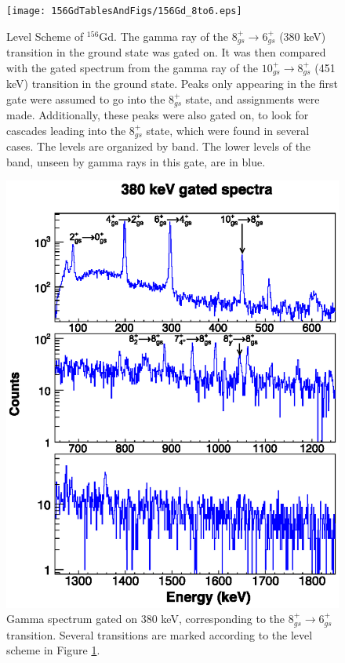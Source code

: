 \begin{figure}[!]
    \centering
    \texttt{[image: 156GdTablesAndFigs/156Gd\_8to6.eps]}
    \caption{Level Scheme of $^{156}$Gd. The gamma ray of the $8^+_{gs}\rightarrow 6^+_{gs}$ (380 keV) transition in the ground state was gated on. It was then compared with the gated spectrum from the gamma ray of the $10^+_{gs}\rightarrow 8^+_{gs}$ (451 keV) transition in the ground state. Peaks only appearing in the first gate were assumed to go into the $8^+_{gs}$ state, and assignments were made. Additionally, these peaks were also gated on, to look for cascades leading into the $8^+_{gs}$ state, which were found in several cases. The levels are organized by band. The lower levels of the band, unseen by gamma rays in this gate, are in blue.}
    \label{fig:156_8to6}
\end{figure}
\begin{figure}
    \includegraphics[scale=1.3]{156GdTablesAndFigs/380_gamma.eps}
    \caption{Gamma spectrum gated on 380 keV, corresponding to the $8^+_{gs}\rightarrow 6^+_{gs}$ transition. Several transitions are marked according to the level scheme in Figure \ref{fig:156_8to6}.}
    \label{fig:156_8to6spec}
\end{figure}